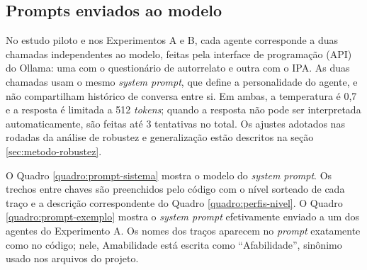 \begin{figure}[htbp]
\end{figure}

\subsection{Prompts enviados ao modelo}
\label{sec:prompts}

No estudo piloto e nos Experimentos A e B, cada agente corresponde a
duas chamadas independentes ao modelo, feitas pela interface de
programação (API) do Ollama: uma com o questionário de autorrelato e
outra com o IPA. As duas chamadas usam o mesmo \textit{system prompt},
que define a personalidade do agente, e não compartilham histórico de
conversa entre si. Em ambas, a temperatura é 0,7 e a resposta é limitada
a 512 \textit{tokens}; quando a resposta não pode ser interpretada
automaticamente, são feitas até 3 tentativas no total. Os ajustes
adotados nas rodadas da análise de robustez e generalização estão
descritos na seção \ref{sec:metodo-robustez}.

O Quadro \ref{quadro:prompt-sistema} mostra o modelo do \textit{system
prompt}. Os trechos entre chaves são preenchidos pelo código com o nível
sorteado de cada traço e a descrição correspondente do Quadro
\ref{quadro:perfis-nivel}. O Quadro \ref{quadro:prompt-exemplo} mostra o
\textit{system prompt} efetivamente enviado a um dos agentes do
Experimento A. Os nomes dos traços aparecem no \textit{prompt} exatamente
como no código; nele, Amabilidade está escrita como ``Afabilidade'',
sinônimo usado nos arquivos do projeto.

